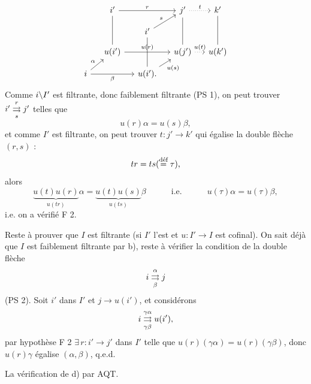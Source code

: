 \[
\begin{tikzcd}[row sep=small, column sep=small]
& i' \arrow[rr, "r"] \arrow[dd, dash] & & j' \arrow[r, dotted, "t"] \arrow[dd, dash] & k' \arrow[dd, dash] \\
& & i' \arrow[ur, "s"] \arrow[dd, dash] & & \\
& u(i') \arrow[rr, "u(r)"] & & u(j') \arrow[r, dotted, "u(t)"] & u(k') \\
i \arrow[ur, "\alpha"] \arrow[rr, "\beta"'] & & u(i'). \arrow[ur, "u(s)"'] & &
\end{tikzcd}
\]
Comme $i\bs I'$ est filtrante, donc faiblement filtrante (PS 1), on peut trouver $i' \dbl{r}{s} j'$ telles que
\[
u(r)\alpha = u(s)\beta,
\]
et comme $I'$ est filtrante, on peut trouver $t : j' \longrightarrow k'$ qui égalise la double flèche $(r, s)$ :
\[
tr = ts(\defeq \tau),
\]
alors
\[
\underbrace{u(t)u(r)}_{u(tr)}\alpha = \underbrace{u(t)u(s)}_{u(ts)}\beta \qquad\quad \text{i.e.} \qquad\quad u(\tau)\alpha = u(\tau)\beta,
\]
i.e. on a vérifié F 2.

Reste à prouver que $I$ est filtrante (si $I'$ l'est et $u : I' \longrightarrow I$ est cofinal). On sait déjà que $I$ est faiblement filtrante par b), reste à vérifier la condition de la double flèche
\[
i \dbl{\alpha}{\beta} j
\]
(PS 2). Soit $i'$ dans $I'$ et $j \longrightarrow u(i')$, et considérons
\[
i \dbl{\gamma\alpha}{\gamma\beta} u(i'),
\]
par hypothèse F 2 $\exists\, r : i' \longrightarrow j'$ dans $I'$ telle que
$u(r)(\gamma\alpha) = u(r)(\gamma\beta)$, donc $u(r)\gamma$ égalise $(\alpha, \beta)$, q.e.d.

La vérification de d) par AQT.

